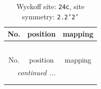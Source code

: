 \documentclass[fleqn,8pt]{jsarticle}
\begin{document}
\renewcommand{\arraystretch}{1.2}
\begin{longtable}{ccc}
\caption{Wyckoff site: {\tt 24c}, site symmetry: {\tt 2.2'2'}}
 \\
 \hline \hline
No. & position & mapping \\ \hline \endfirsthead

\multicolumn{2}{l}{\tablename\ \thetable{}} \\
 \hline \hline
No. & position & mapping \\ \hline \endhead

 \hline \hline
\multicolumn{2}{r}{\footnotesize\it continued ...} \\ \endfoot

 \hline \hline
\multicolumn{2}{r}{} \\ \endlastfoot


\end{longtable}
\end{document}
